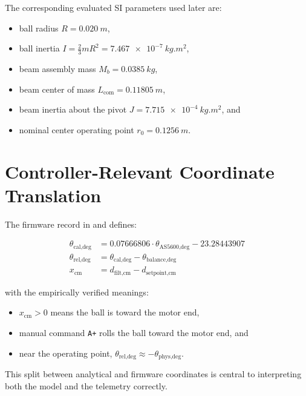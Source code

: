 The corresponding evaluated SI parameters used later are:

\begin{itemize}
  \item ball radius $R = \SI{0.020}{m}$,
  \item ball inertia $I = \tfrac{2}{3} m R^2 = \SI{7.467e-7}{kg.m^2}$,
  \item beam assembly mass $M_b = \SI{0.0385}{kg}$,
  \item beam center of mass $L_{\text{com}} = \SI{0.11805}{m}$,
  \item beam inertia about the pivot $J = \SI{7.715e-4}{kg.m^2}$, and
  \item nominal center operating point $r_0 = \SI{0.1256}{m}$.
\end{itemize}

\section{Controller-Relevant Coordinate Translation}

The firmware record in  and  defines:

\begin{align}
  \theta_{\text{cal,deg}} &= 0.07666806 \cdot \theta_{\text{AS5600,deg}} - 23.28443907 \\
  \theta_{\text{rel,deg}} &= \theta_{\text{cal,deg}} - \theta_{\text{balance,deg}} \\
  x_{\text{cm}} &= d_{\text{filt,cm}} - d_{\text{setpoint,cm}}
\end{align}

with the empirically verified meanings:

\begin{itemize}
  \item $x_{\text{cm}} > 0$ means the ball is toward the motor end,
  \item manual command \verb|A+| rolls the ball toward the motor end, and
  \item near the operating point, $\theta_{\text{rel,deg}} \approx -\theta_{\text{phys,deg}}$.
\end{itemize}

This split between analytical and firmware coordinates is central to interpreting both
the model and the telemetry correctly.
